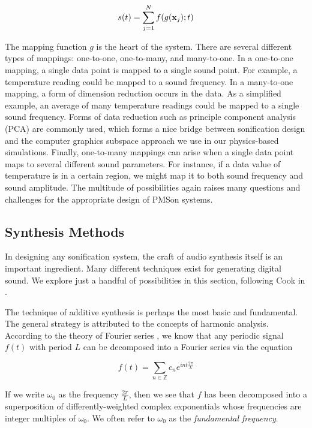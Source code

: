 \begin{equation}
s(t) = \sum_{j=1}^N f(g(\mathbf{x}_j); t)
\end{equation}

The mapping function $g$ is the heart of the system. There are several 
different types of mappings: one-to-one, one-to-many, and many-to-one. In a 
one-to-one mapping, a single data point is mapped to a single sound point. 
For example, a temperature reading could be mapped to a sound frequency. In a 
many-to-one mapping, a form of dimension reduction occurs in the data. As a 
simplified example, an average of many temperature readings could be mapped 
to a single sound frequency. Forms of data reduction such as principle 
component analysis (PCA) are commonly used, which forms a nice bridge between 
sonification design and the computer graphics subspace approach we use in our 
physics-based simulations. Finally, one-to-many mappings can arise when a 
single data point maps to several different sound parameters. For instance, 
if a data value of temperature is in a certain region, we might map it to 
both sound frequency and sound amplitude. The multitude of possibilities 
again raises many questions and challenges for the appropriate design of 
PMSon systems.

\subsection{Synthesis Methods}
\label{sec:synthesis-metthods}
In designing any sonification system, the craft of audio synthesis itself is 
an important ingredient. Many different techniques exist for generating 
digital sound. We explore just a handful of possibilities in this section, following Cook in \cite{hermann2011sonification}.

The technique of additive synthesis is perhaps the most basic and 
fundamental. The general strategy is attributed to the concepts of harmonic 
analysis. According to the theory of Fourier series \cite{katznelson2004introduction}, we know that any 
periodic signal $f(t)$ with period $L$ can be decomposed into a Fourier 
series via the equation

\begin{equation}
f(t) = \sum_{n \in \mathbb{Z}} c_n e^{int \frac{2\pi}{L}}
\end{equation}

If we write $\omega_0$ as the frequency $\frac{2\pi}{L}$, then we see that $f$
 has been decomposed into a superposition of differently-weighted complex 
exponentials whose frequencies are integer multiples of $\omega_0$. We often 
refer to $\omega_0$ as the {\em fundamental frequency}. 

